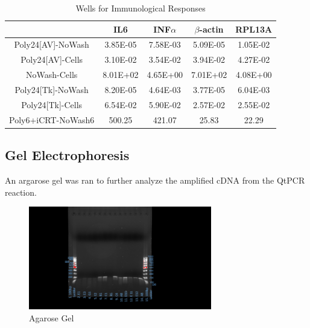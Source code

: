 \documentclass[journal, a4paper]{IEEEtran}
\begin{document}
    \begin{table}[!hbt]
      \begin{center}
      \caption{Wells for Immunological Responses}
      \label{tab:simParameters}
      \begin{tabular}{|c|c|c|c|c|}
        \hline
        & IL6 & INF$\alpha$ & $\beta$-actin & RPL13A \\
        \hline
        Poly24[AV]-NoWash & 3.85E-05 & 7.58E-03 & 5.09E-05 & 1.05E-02 \\
        \hline
        Poly24[AV]-Cells & 3.10E-02 & 3.54E-02 & 3.94E-02 & 4.27E-02 \\
        \hline
        NoWash-Cells & 8.01E+02 & 4.65E+00 & 7.01E+02 & 4.08E+00 \\
        \hline
        Poly24[Tk]-NoWash & 8.20E-05 & 4.64E-03 & 3.77E-05 & 6.04E-03\\
        \hline
        Poly24[Tk]-Cells & 6.54E-02 & 5.90E-02 & 2.57E-02 & 2.55E-02\\
        \hline
        Poly6+iCRT-NoWash6 & 500.25 & 421.07 & 25.83 & 22.29 \\
        \hline
      \end{tabular}
      \end{center}
    \end{table}

  \subsection{Gel Electrophoresis}
    An argarose gel was ran to further analyze the amplified cDNA from the QtPCR reaction.

    \begin{figure}[t]
      \centering
      \includegraphics[width=8cm]{supergel}
      \caption{Agarose Gel}
      \label{fig:mesh1}
    \end{figure}
\end{document}
